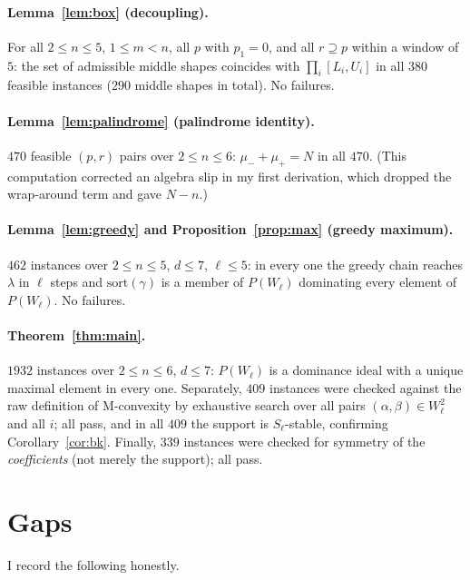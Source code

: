 \documentclass[11pt]{article}
\theoremstyle{plain}
\theoremstyle{definition}
\begin{document}
\paragraph{Lemma~\ref{lem:box} (decoupling).}
For all $2\le n\le 5$, $1\le m<n$, all $p$ with $p_1=0$, and all $r\supseteq p$ within a window
of $5$: the set of admissible middle shapes coincides with $\prod_i[L_i,U_i]$ in all $380$
feasible instances ($290$ middle shapes in total). No failures.

\paragraph{Lemma~\ref{lem:palindrome} (palindrome identity).}
$470$ feasible $(p,r)$ pairs over $2\le n\le 6$: $\mu_-+\mu_+=N$ in all $470$. (This
computation corrected an algebra slip in my first derivation, which dropped the wrap-around
term and gave $N-n$.)

\paragraph{Lemma~\ref{lem:greedy} and Proposition~\ref{prop:max} (greedy maximum).}
$462$ instances over $2\le n\le 5$, $d\le 7$, $\ell\le 5$: in every one the greedy chain
reaches $\lambda$ in $\ell$ steps and $\mathrm{sort}(\gamma)$ is a member of $P(W_\ell)$
dominating every element of $P(W_\ell)$. No failures.

\paragraph{Theorem~\ref{thm:main}.}
$1932$ instances over $2\le n\le 6$, $d\le 7$: $P(W_\ell)$ is a dominance ideal with a unique
maximal element in every one. Separately, $409$ instances were checked against the raw
definition of M-convexity by exhaustive search over all pairs $(\alpha,\beta)\in W_\ell^2$ and
all $i$; all pass, and in all $409$ the support is $S_\ell$-stable, confirming
Corollary~\ref{cor:bk}. Finally, $339$ instances were checked for symmetry of the
\emph{coefficients} (not merely the support); all pass.

\section{Gaps}

I record the following honestly.
\end{document}
